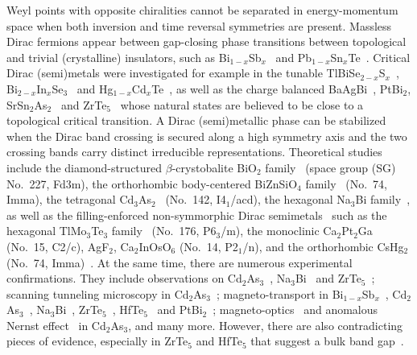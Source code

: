 Weyl points with opposite chiralities cannot be separated in energy-momentum space when both inversion and time reversal symmetries are present. Massless Dirac fermions appear between gap-closing phase transitions between topological and trivial (crystalline) insulators, such as Bi$_{1-x}$Sb$_x$~\cite{TeoFuKane08} and Pb$_{1-x}$Sn$_x$Te~\cite{Hsieh:2012fk}. Critical Dirac (semi)metals were investigated for example in the tunable TlBiSe$_{2-x}$S$_x$~\cite{SatoTakahashi11,SoumaAndo12,XuCavaHasan11}, Bi$_{2−x}$In$_x$Se$_3$~\cite{BrahlekSeongshik12,WuArmitage13} and Hg$_{1-x}$Cd$_x$Te~\cite{OrlitaPotemski14}, as well as the charge balanced BaAgBi~\cite{DuWanXYBi15}, PtBi$_2$, SrSn$_2$As$_2$~\cite{GibsonCava15} and ZrTe$_5$~\cite{LiVallaZrTe516} whose natural states are believed to be close to a topological critical transition. A Dirac (semi)metallic phase can be stabilized when the Dirac band crossing is secured along a high symmetry axis and the two crossing bands carry distinct irreducible representations. Theoretical studies include the diamond-structured $\beta$-crystobalite BiO$_2$ family~\cite{BiO3_Dirac_semimetal} (space group (\hypertarget{SG}{SG}) No.~227, Fd3m), the orthorhombic body-centered BiZnSiO$_4$ family~\cite{SteinbergYoungZaheerKaneMeleRappe14} (\SG No.~74, Imma), the tetragonal Cd$_3$As$_2$~\cite{wangCd3As2PRB13} (\SG No.~142, I4$_1$/acd), the hexagonal Na$_3$Bi family~\cite{Dai_predition_Na3Bi}, as well as the filling-enforced non-symmorphic Dirac semimetals~\cite{KonigMermin97,ParameswaranTurnerArovasVishwanath13,WatanabePoVishwanathZaletel15,ChenKimKee16,WatanabePoZaletelVishwanath16,BradlynBernevig17} such as the hexagonal TlMo$_3$Te$_3$ family~\cite{GibsonCava15} (\SG No.~176, P6$_3$/m), the monoclinic Ca$_2$Pt$_2$Ga (\SG No.~15, C2/c), AgF$_2$, Ca$_2$InOsO$_6$ (\SG No.~14, P2$_1$/n), and the orthorhombic CsHg$_2$ (\SG No.~74, Imma)~\cite{ChenPoNeatonVishwanath16}. At the same time, there are numerous experimental confirmations. They include \ARPES observations on Cd$_2$As$_3$~\cite{Cd3As2Chen2014,neupaneDiracHasan,borisenkoPRLCd3As2}, Na$_3$Bi~\cite{Liu21022014,Xu18122014} and ZrTe$_5$~\cite{LiVallaZrTe516}; scanning tunneling microscopy in Cd$_2$As$_3$~\cite{Yazdani_CdAs}; magneto-transport in Bi$_{1-x}$Sb$_x$~\cite{KimLiBiSb13}, Cd$_2$As$_3$~\cite{liangOngTransportCd3As2,HeLi14,XiangChen15,FengLuCd3As215,LiYuCd3As215,LiWangCd3As216,GuoLeeCd2As316,ZhangXiuCd3As217}, Na$_3$Bi~\cite{Xu18122014,XiongOng15}, ZrTe$_5$~\cite{ZhengMingliangZrTe514,LiVallaZrTe516,LiangOngHallZrTe516,YuanXiuZrTe516}, HfTe$_5$~\cite{WangWangHfTe516} and PtBi$_2$~\cite{GaoTianPtBi217}; magneto-optics~\cite{AkrapOrlitaCd2As316} and anomalous Nernst effect~\cite{LiangOngNernstCd3As217} in Cd$_2$As$_3$, and many more. However, there are also contradicting pieces of evidence, especially in ZrTe$_5$ and HfTe$_5$ that suggest a bulk band gap~\cite{WengDaiFangZrTe514,LiXingZrTe516,WuPanZrTe516,MoreschiniGrioniZrTe516,ManzoniCrepaldiZrTe516,ManzoniParmigianiZrTe517,FanZhouZrTe517}.
